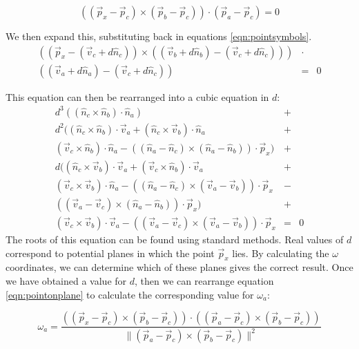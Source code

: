 \begin{equation}
((\vec{p}_x-\vec{p}_c) \times (\vec{p}_b-\vec{p}_c)) \cdot (\vec{p}_a-\vec{p}_c) = 0
\end{equation}

We then expand this, substituting back in equations \ref{eqn:pointsymbols}.
\begin{eqnarray}
((\vec{p}_x-(\vec{v}_c + d\hat{n}_c)) \times ((\vec{v}_b + d\hat{n}_b)-(\vec{v}_c + d\hat{n}_c))) & \cdot & \nonumber \\
((\vec{v}_a + d\hat{n}_a)-(\vec{v}_c + d\hat{n}_c)) & = & 0
\end{eqnarray}

This equation can then be rearranged into a cubic equation in $d$:
\begin{eqnarray} \label{eqn:cubicd}
d^3((\hat{n}_c \times \hat{n}_b) \cdot \hat{n}_a) & + & \nonumber \\
d^2((\hat{n}_c\times \hat{n}_b )\cdot \vec{v}_a + (\hat{n}_c\times \vec{v}_b )\cdot \hat{n}_a & + & \nonumber \\
(\vec{v}_c\times \hat{n}_b)\cdot \hat{n}_a - ((\hat{n}_a - \hat{n}_c)\times(\hat{n}_a - \hat{n}_b))\cdot \vec{p}_x) & + & \nonumber \\
d((\hat{n}_c\times \vec{v}_b)\cdot \vec{v}_a + (\vec{v}_c\times \hat{n}_b)\cdot \vec{v}_a & + & \nonumber \\
(\vec{v}_c\times \vec{v}_b)\cdot \hat{n}_a - ((\hat{n}_a - \hat{n}_c)\times(\vec{v}_a - \vec{v}_b))\cdot \vec{p}_x & - & \nonumber \\
((\vec{v}_a - \vec{v}_c)\times(\hat{n}_a - \hat{n}_b))\cdot \vec{p}_x) & + & \nonumber \\
(\vec{v}_c\times \vec{v}_b)\cdot \vec{v}_a - ((\vec{v}_a - \vec{v}_c)\times(\vec{v}_a - \vec{v}_b))\cdot \vec{p}_x & = & 0
\end{eqnarray}
The roots of this equation can be found using standard methods. Real values of $d$ correspond to potential planes in which the point $\vec{p}_x$ lies. By calculating the $\omega$ coordinates, we can determine which of these planes gives the correct result. Once we have obtained a value for $d$, then we can rearrange equation \ref{eqn:pointonplane} to calculate the corresponding value for $\omega_a$: 

\begin{equation} \label{eqn:omega_a}
\omega_a = \frac{((\vec{p}_x-\vec{p}_c) \times (\vec{p}_b-\vec{p}_c)) \cdot ((\vec{p}_a-\vec{p}_c) \times (\vec{p}_b-\vec{p}_c))}{\|(\vec{p}_a-\vec{p}_c) \times (\vec{p}_b-\vec{p}_c)\|^2}
\end{equation}

